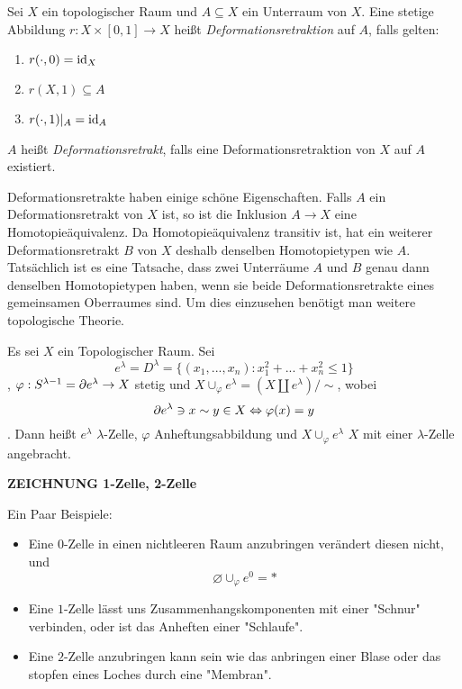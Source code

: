 \documentclass[a4paper,11pt]{article}
\begin{document}
\begin{definition}[Deformationsretrakt]
    Sei $X$ ein topologischer Raum und $A \subseteq X$ ein Unterraum von $X$.
    Eine stetige Abbildung $r: X \times [0, 1] \rightarrow X$ heißt 
    \textit{Deformationsretraktion} auf $A$, falls gelten:
    \begin{enumerate}
        \item $r(\cdot, 0) = {\operatorname{id}}_X$
        \item $r(X, 1) \subseteq A$
        \item $r(\cdot, 1)|_A = {\operatorname{id}}_A$
    \end{enumerate}
    $A$ heißt \textit{Deformationsretrakt}, falls eine Deformationsretraktion
    von $X$ auf $A$ existiert.
\end{definition}

Deformationsretrakte haben einige schöne Eigenschaften. Falls $A$ ein
Deformationsretrakt von $X$ ist, so ist die Inklusion $A \rightarrow X$ eine
Homotopieäquivalenz. Da Homotopieäquivalenz transitiv ist, hat ein weiterer
Deformationsretrakt $B$ von $X$ deshalb denselben Homotopietypen wie $A$. \\
Tatsächlich ist es eine Tatsache, dass zwei Unterräume $A$ und $B$ genau dann
denselben Homotopietypen haben, wenn sie beide Deformationsretrakte eines 
gemeinsamen Oberraumes sind. Um dies einzusehen benötigt man weitere 
topologische Theorie.

\begin{definition}
    Es sei $X$ ein Topologischer Raum. Sei
    \[ e^{\lambda} = D^{\lambda} = \{(x_1, ..., x_n): x_1^2 + ... + x_n^2 \leq 1\} \]
    , $\varphi: S^{\lambda - 1} = {\partial} e^{\lambda} \rightarrow X$ stetig
    und $X \cup_{\varphi} e^{\lambda} = (X \amalg e^{\lambda}) / \sim$, wobei
    \[ {\partial} e^{\lambda} \ni x \sim y \in X \Leftrightarrow \varphi(x) = y \]
    . Dann heißt $e^{\lambda}$ $\lambda$-Zelle, $\varphi$ Anheftungsabbildung 
    und $X \cup_{\varphi} e^{\lambda}$ $X$ mit einer $\lambda$-Zelle angebracht.
\end{definition}

\textbf{ZEICHNUNG 1-Zelle, 2-Zelle}

Ein Paar Beispiele: 
\begin{itemize}
    \item Eine $0$-Zelle in einen nichtleeren Raum anzubringen 
        verändert diesen nicht, und
        \[\varnothing \cup_{\varphi} e^0 = \ast\]
    \item Eine $1$-Zelle lässt uns Zusammenhangskomponenten mit einer "Schnur"
            verbinden, oder ist das Anheften einer "Schlaufe".
    \item Eine $2$-Zelle anzubringen kann sein wie das anbringen einer Blase oder
        das stopfen eines Loches durch eine "Membran".
\end{itemize}
\end{document}
